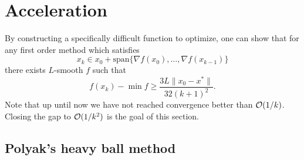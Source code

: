 \chapter{Acceleration}

By constructing a specifically difficult function to optimize, one can show that for any first order method which satisfies
\begin{equation}
    x_k\in x_0+\mathrm{span}\{\nabla f(x_0),\dots,\nabla f(x_{k-1})\}
\end{equation}
there exists $L$-smooth $f$ such that
\begin{equation}
    f(x_k)-\min f\geq\frac{3L\|x_0-x^*\|}{32(k+1)^2}.
\end{equation}
Note that up until now we have not reached convergence better than $\mathcal{O}(1/k)$. Closing the gap to $\mathcal{O}(1/k^2)$ is the goal of this section.

\section{Polyak's heavy ball method}

